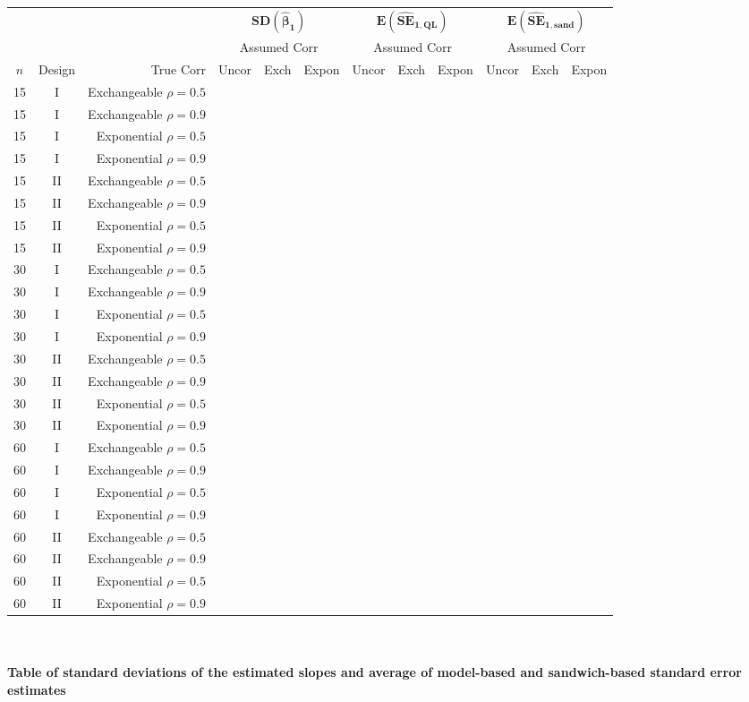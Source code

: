 \documentclass[11pt, letterpaper]{article}
\begin{document}
{\begin{center}
\begin{tabular}{ccr|ccc|ccc|ccc}
&&&\multicolumn{3}{|c}{$\mathbf{SD(\hat\beta_1)}$}&\multicolumn{3}{|c}{$\mathbf{E(\widehat{SE}_{1,QL})}$}&\multicolumn{3}{|c}{$\mathbf{E(\widehat{SE}_{1,sand})}$}\\
&&&\multicolumn{3}{c}{Assumed Corr}&\multicolumn{3}{|c}{Assumed Corr}&\multicolumn{3}{|c}{Assumed Corr}\\
$n$ & Design & True Corr & Uncor & Exch & Expon & Uncor & Exch & Expon & Uncor & Exch & Expon \\ \hline
15 &  I & Exchangeable $\rho=0.5$ & & & & & & & & & \\
15 &  I & Exchangeable $\rho=0.9$ & & & & & & & & & \\
15 &  I &         Exponential $\rho=0.5$ & & & & & & & & & \\
15 &  I &         Exponential $\rho=0.9$ & & & & & & & & & \\ [1ex]
15 & II & Exchangeable $\rho=0.5$ & & & & & & & & & \\
15 & II & Exchangeable $\rho=0.9$ & & & & & & & & & \\
15 & II &         Exponential $\rho=0.5$ & & & & & & & & & \\
15 & II &         Exponential $\rho=0.9$ & & & & & & & & & \\ [2ex]
30 &  I & Exchangeable $\rho=0.5$ & & & & & & & & & \\
30 &  I & Exchangeable $\rho=0.9$ & & & & & & & & & \\
30 &  I &         Exponential $\rho=0.5$ & & & & & & & & & \\
30 &  I &         Exponential $\rho=0.9$ & & & & & & & & & \\ [1ex]
30 & II & Exchangeable $\rho=0.5$ & & & & & & & & & \\
30 & II & Exchangeable $\rho=0.9$ & & & & & & & & & \\
30 & II &         Exponential $\rho=0.5$ & & & & & & & & & \\
30 & II &         Exponential $\rho=0.9$ & & & & & & & & & \\ [2ex]
60 &  I & Exchangeable $\rho=0.5$ & & & & & & & & & \\
60 &  I & Exchangeable $\rho=0.9$ & & & & & & & & & \\
60 &  I &         Exponential $\rho=0.5$ & & & & & & & & & \\
60 &  I &        Exponential $\rho=0.9$ & & & & & & & & & \\ [1ex]
60 & II & Exchangeable $\rho=0.5$ & & & & & & & & & \\
60 & II & Exchangeable $\rho=0.9$ & & & & & & & & & \\
60 & II &         Exponential $\rho=0.5$ & & & & & & & & & \\
60 & II &         Exponential $\rho=0.9$ & & & & & & & & & 
\end{tabular}\\~\\
\textbf{Table of standard deviations of the estimated slopes and 
average of model-based and sandwich-based standard error estimates}
\end{center}
}
\end{document}
